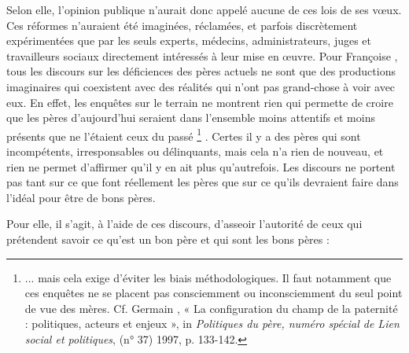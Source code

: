  Selon elle, l'opinion publique n'aurait donc appelé aucune de ces lois de ses vœux. Ces réformes n'auraient été imaginées, réclamées, et parfois discrètement expérimentées que par les seuls experts, médecins, administrateurs, juges et travailleurs sociaux directement intéressés à leur mise en œuvre. Pour Françoise , tous les discours sur les déficiences des pères actuels ne sont que des productions imaginaires qui coexistent avec des réalités qui n'ont pas grand-chose à voir avec eux. En effet, les enquêtes sur le terrain ne montrent rien qui permette de croire que les pères d'aujourd'hui seraient dans l'ensemble moins attentifs et moins présents que ne l'étaient ceux du passé%
\footnote{... mais cela exige d'éviter les biais méthodologiques. Il faut notamment que ces enquêtes ne se placent pas consciemment ou inconsciemment du seul point de vue des mères. Cf. Germain , « La configuration du champ de la paternité : politiques, acteurs et enjeux », in \emph{Politiques du père, numéro spécial de Lien social et politiques}, (n° 37) 1997, p. 133-142.}%
. Certes il y a des pères qui sont incompétents, irresponsables ou délinquants, mais cela n'a rien de nouveau, et rien ne permet d'affirmer qu'il y en ait plus qu'autrefois. Les discours ne portent pas tant sur ce que font réellement les pères que sur ce qu'ils devraient faire dans l'idéal pour être de bons pères. 

Pour elle, il s'agit, à l'aide de ces discours, d'asseoir l'autorité de ceux qui prétendent savoir ce qu'est un bon père et qui sont les bons pères :
 
